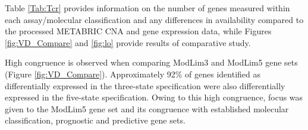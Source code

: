 Table \ref{Tab:Tcr} provides information on the number of genes measured within each assay/molecular classification and any differences in availability compared to the processed METABRIC CNA and gene expression data, while Figures \ref{fig:VD_Compare} and \ref{fig:lo} provide results of comparative study.

High congruence is observed when comparing ModLim3 and ModLim5 gene sets (Figure \ref{fig:VD_Compare}). Approximately 92\% of genes identified as differentially expressed in the three-state specification were also differentially expressed in the five-state specification. Owing to this high congruence, focus was given to the ModLim5 gene set and its congruence with established molecular classification, prognostic and predictive gene sets. 

\vfill
\begin{table}[!h]
\caption{Table containing gene set information for each assay and availability in the METABRIC data.}
\label{Tab:Tcr}
\end{table}
